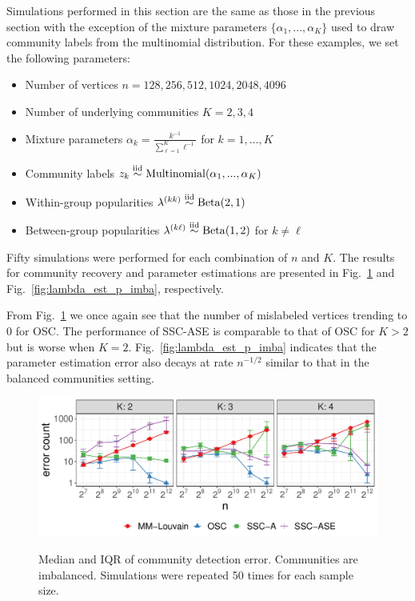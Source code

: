 \documentclass[12pt]{article}
\providecommand{\tightlist}{%
  \setlength{\itemsep}{0pt}\setlength{\parskip}{0pt}}
\begin{document}
Simulations performed in this section are the same as those in the
previous section with the exception of the mixture parameters
\(\{\alpha_1, ..., \alpha_K\}\) used to draw community labels from the
multinomial distribution. For these examples, we set the following
parameters:

\begin{itemize}
\tightlist
\item
  Number of vertices \(n = 128, 256, 512, 1024, 2048, 4096\)
\item
  Number of underlying communities \(K = 2, 3, 4\)
\item
  Mixture parameters \(\alpha_k = \frac{k^{-1}}{\sum_{\ell=1}^K \ell^{-1}}\)
  for \(k = 1, ..., K\)
\item
  Community labels
  \(z_k \stackrel{\text{iid}}{\sim} \mathrm{Multinomial}(\alpha_1, ..., \alpha_K)\)
\item
  Within-group popularities
  \(\lambda^{(kk)} \stackrel{\text{iid}}{\sim} \mathrm{Beta}(2, 1)\)
\item
  Between-group popularities
  \(\lambda^{(k \ell)} \stackrel{\text{iid}}{\sim} \mathrm{Beta}(1, 2)\) for
  \(k \neq \ell\)
\end{itemize}
Fifty simulations were performed for each combination of $n$ and
$K$. The results for community recovery and parameter estimations are
presented in Fig.~\ref{fig:clust_err_ct_sim_imba} and Fig.~\ref{fig:lambda_est_p_imba}, respectively.

From Fig.~\ref{fig:clust_err_ct_sim_imba} we once again see that the
number of mislabeled vertices trending to $0$ for OSC. The
performance of SSC-ASE is comparable to that of OSC for $K > 2$ but
is worse when $K = 2$. Fig.~\ref{fig:lambda_est_p_imba} indicates that
the parameter estimation error also decays at rate $n^{-1/2}$ similar
to that in the balanced communities setting.

\begin{figure}[H]
{\centering \includegraphics{summary_files/figure-latex/clust_err_ct_sim_imba-1}
}
\caption{Median and IQR of community detection error. Communities are imbalanced. 
Simulations were repeated 50 times for each sample size.}\label{fig:clust_err_ct_sim_imba}
\end{figure}
\end{document}
